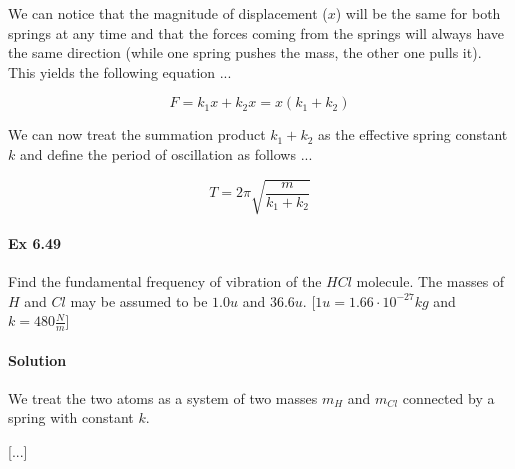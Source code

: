 \documentclass{article}
\begin{document}
We can notice that the magnitude of displacement ($x$) will be the same for both springs at any time and that the forces coming from the springs will always have the same direction (while one spring pushes the mass, the other one pulls it). This yields the following equation ...

\[ F = k_{1}x + k_{2}x = x(k_{1} + k_{2}) \]

We can now treat the summation product $k_{1} + k_{2}$ as the effective spring constant $k$ and define the period of oscillation as follows ...

\[ T = 2 \pi \sqrt{\frac{m}{k_{1} + k_{2}}} \]


\paragraph{Ex 6.49}
Find the fundamental frequency of vibration of the $HCl$ molecule. The masses of $H$ and $Cl$ may be assumed to be $1.0u$ and $36.6u$. [$1u = 1.66 \cdot 10^{-27} kg$ and $k = 480 \frac{N}{m}$]
\paragraph{Solution}

We treat the two atoms as a system of two masses $m_{H}$ and $m_{Cl}$ connected by a spring with constant $k$.

[...]

\end{document}
